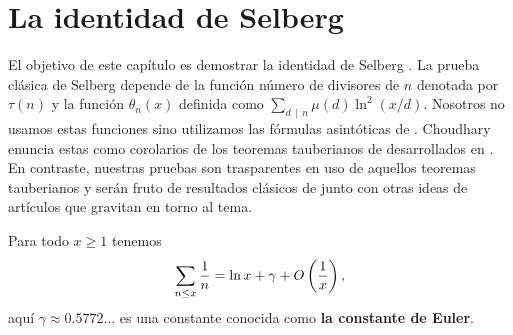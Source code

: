 \setlength{\headheight}{14.61858pt}
\pagestyle{fancy}

\chapter[La identidad de Selberg]
{La identidad de Selberg}
\label{ch:selberg}

El objetivo de este cap\'itulo es demostrar
la identidad de Selberg \cite[ecuaci\'on 2.8]{Selberg1949}.
La prueba cl\'asica de Selberg depende de la funci\'on
n\'umero de divisores de \(n\) denotada por \(\tau(n)\)
y la funci\'on \(\theta_n(x)\) definida como \(\sum_{d \, \mid \, n} \mu(d) \ln^2(x / d)\).
Nosotros no usamos estas funciones
sino utilizamos las f\'ormulas asint\'oticas
de \cite[corolario 4.2]{Choudhary2017}.
Choudhary enuncia estas como corolarios de los
teoremas tauberianos de \cite{Shapiro1959}
desarrollados en \cite[teorema 4.1]{Choudhary2017}.
En contraste, nuestras pruebas son trasparentes en uso
de aquellos teoremas tauberianos y ser\'an fruto de
resultados cl\'asicos de \cite{Apostol1976}
junto con otras ideas de art\'iculos que gravitan en torno al tema.

\begin{lemma}
  \label{lem:harmonic}
  Para todo \(x \geq 1\) tenemos
  \[
    \sum_{n \leq x} \frac{1}{n} = \ln x + \gamma + O\left( \frac{1}{x} \right),
  \]
  aqu\'i \(\gamma \approx 0.5772 \dots\) es una constante conocida como
  \textbf{la constante de Euler}.
\end{lemma}

